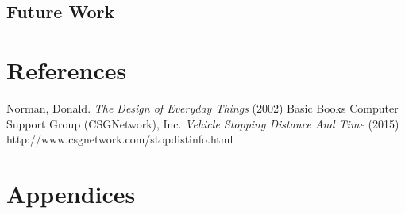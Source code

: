 \documentclass[11pt]{article}
\begin{document}
	\subsection{Future Work} %
	\section{References}
	
	\begin{thebibliography}{9}
			 Norman, Donald. \emph{The Design of Everyday Things} (2002) Basic Books
			Computer Support Group (CSGNetwork), Inc. \emph{Vehicle Stopping Distance And Time} (2015) http://www.csgnetwork.com/stopdistinfo.html
	\end{thebibliography}
	

	\section{Appendices} %
\end{document}
